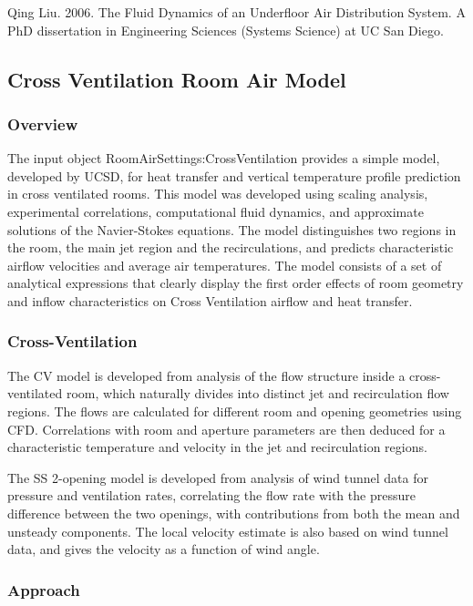 Qing Liu. 2006. The Fluid Dynamics of an Underfloor Air Distribution System. A PhD dissertation in Engineering Sciences (Systems Science) at UC San Diego.

\subsection{Cross Ventilation Room Air Model}\label{cross-ventilation-room-air-model}

\subsubsection{Overview}\label{overview-3-001}

The input object RoomAirSettings:CrossVentilation provides a simple model, developed by UCSD, for heat transfer and vertical temperature profile prediction in cross ventilated rooms. This model was developed using scaling analysis, experimental correlations, computational fluid dynamics, and approximate solutions of the Navier-Stokes equations. The model distinguishes two regions in the room, the main jet region and the recirculations, and predicts characteristic airflow velocities and average air temperatures. The model consists of a set of analytical expressions that clearly display the first order effects of room geometry and inflow characteristics on Cross Ventilation airflow and heat transfer.

\subsubsection{Cross-Ventilation}\label{cross-ventilation}

The CV model is developed from analysis of the flow structure inside a cross-ventilated room, which naturally divides into distinct jet and recirculation flow regions. The flows are calculated for different room and opening geometries using CFD. Correlations with room and aperture parameters are then deduced for a characteristic temperature and velocity in the jet and recirculation regions.

The SS 2-opening model is developed from analysis of wind tunnel data for pressure and ventilation rates, correlating the flow rate with the pressure difference between the two openings, with contributions from both the mean and unsteady components. The local velocity estimate is also based on wind tunnel data, and gives the velocity as a function of wind angle.

\subsubsection{Approach}\label{approach}

